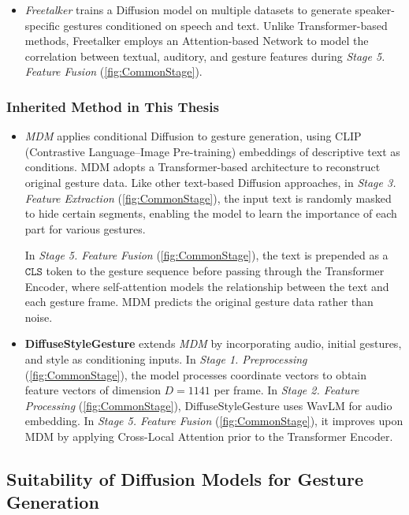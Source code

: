 \begin{itemize}
	\item \textit{Freetalker} \cite{yang2024freetalker} trains a Diffusion model on multiple datasets to generate speaker-specific gestures conditioned on speech and text. Unlike Transformer-based methods, Freetalker employs an Attention-based Network to model the correlation between textual, auditory, and gesture features during \textit{Stage 5. Feature Fusion} (\autoref{fig:CommonStage}).
\end{itemize}

\subsubsection{Inherited Method in This Thesis}

\begin{itemize}
	\item \textit{MDM} \cite{tevet2022human} applies conditional Diffusion to gesture generation, using CLIP (Contrastive Language–Image Pre-training) embeddings of descriptive text as conditions. MDM adopts a Transformer-based architecture to reconstruct original gesture data. Like other text-based Diffusion approaches, in \textit{Stage 3. Feature Extraction} (\autoref{fig:CommonStage}), the input text is randomly masked to hide certain segments, enabling the model to learn the importance of each part for various gestures. 
	
	In \textit{Stage 5. Feature Fusion} (\autoref{fig:CommonStage}), the text is prepended as a $\texttt{CLS}$ token to the gesture sequence before passing through the Transformer Encoder, where self-attention models the relationship between the text and each gesture frame. MDM predicts the original gesture data rather than noise.
	
	\item \textbf{DiffuseStyleGesture} \cite{yang2023diffusestylegesture} extends \textit{MDM} \cite{tevet2022human} by incorporating audio, initial gestures, and style as conditioning inputs. In \textit{Stage 1. Preprocessing} (\autoref{fig:CommonStage}), the model processes coordinate vectors to obtain feature vectors of dimension $D=1141$ per frame. In \textit{Stage 2. Feature Processing} (\autoref{fig:CommonStage}), DiffuseStyleGesture uses WavLM for audio embedding. In \textit{Stage 5. Feature Fusion} (\autoref{fig:CommonStage}), it improves upon MDM by applying Cross-Local Attention prior to the Transformer Encoder.
\end{itemize}

\subsection{Suitability of Diffusion Models for Gesture Generation}
\label{subsec:reason}

